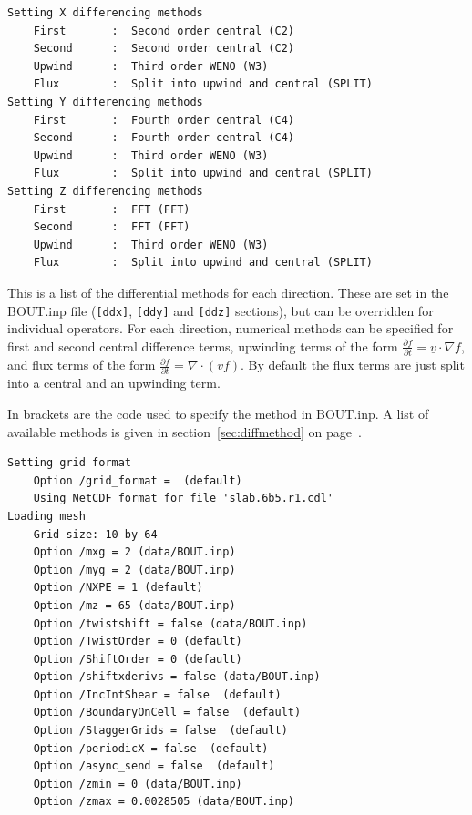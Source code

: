 \documentclass[12pt]{article}
\newcommand{\code}[1]{\texttt{#1}}
\newcommand{\deriv}[2]{\ensuremath{\frac{\partial #1}{\partial #2}}}
\begin{document}
\begin{verbatim}
Setting X differencing methods
	First       :  Second order central (C2)
	Second      :  Second order central (C2)
	Upwind      :  Third order WENO (W3)
	Flux        :  Split into upwind and central (SPLIT)
Setting Y differencing methods
	First       :  Fourth order central (C4)
	Second      :  Fourth order central (C4)
	Upwind      :  Third order WENO (W3)
	Flux        :  Split into upwind and central (SPLIT)
Setting Z differencing methods
	First       :  FFT (FFT)
	Second      :  FFT (FFT)
	Upwind      :  Third order WENO (W3)
	Flux        :  Split into upwind and central (SPLIT)
\end{verbatim}

This is a list of the differential methods for each direction. These are set in the
BOUT.inp file (\code{[ddx]}, \code{[ddy]} and \code{[ddz]} sections), but can be overridden
for individual operators. For each direction, numerical methods can be specified for
first and second central difference terms, upwinding terms of the form
$\deriv{f}{t} = \underline{v}\cdot\nabla f$,
and flux terms of the form $\deriv{f}{t} = \nabla\cdot\left(\underline{v}f\right)$.
By default the flux terms are just split into a central and an upwinding term.

In brackets are the code used to specify the method in BOUT.inp. A list
of available methods is given in section~\ref{sec:diffmethod} on page~\pageref{sec:diffmethod}.

\begin{verbatim}
Setting grid format
	Option /grid_format =  (default)
	Using NetCDF format for file 'slab.6b5.r1.cdl'
Loading mesh
	Grid size: 10 by 64
	Option /mxg = 2 (data/BOUT.inp)
	Option /myg = 2 (data/BOUT.inp)
	Option /NXPE = 1 (default)
	Option /mz = 65 (data/BOUT.inp)
	Option /twistshift = false (data/BOUT.inp)
	Option /TwistOrder = 0 (default)
	Option /ShiftOrder = 0 (default)
	Option /shiftxderivs = false (data/BOUT.inp)
	Option /IncIntShear = false  (default)
	Option /BoundaryOnCell = false  (default)
	Option /StaggerGrids = false  (default)
	Option /periodicX = false  (default)
	Option /async_send = false  (default)
	Option /zmin = 0 (data/BOUT.inp)
	Option /zmax = 0.0028505 (data/BOUT.inp)
\end{verbatim}
\end{document}
